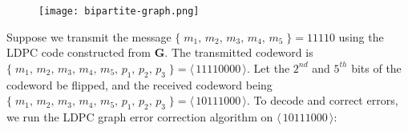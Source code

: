 \documentclass{AssignmentCUNY}
\newcommand{\CodeWord}[1]{\ensuremath{\langle\,#1\,\rangle}}
\begin{document}
\CoverPage

%
\begin{figure}[h]
	\centering
	\texttt{[image: bipartite-graph.png]}
\end{figure}

Suppose we transmit the message $\{\;m_1,\, m_2,\, m_3,\, m_4,\, m_5\;\} = 11110$ using the LDPC code constructed from $\mathbf{G}$.
The transmitted codeword is $\{\;m_1,\, m_2,\, m_3,\, m_4,\, m_5,\, p_1,\, p_2,\, p_3 \;\} = \CodeWord{11110000}$.
Let the $2^{nd}$ and $5^{th}$ bits of the codeword be flipped, and the received codeword being$ \{\;m_1,\, m_2,\, m_3,\, m_4,\, m_5,\, p_1,\, p_2,\, p_3 \;\} = \CodeWord{10111000}$. To decode and correct errors, we run the LDPC graph error correction algorithm on $\CodeWord{10111000}$:
\end{document}
